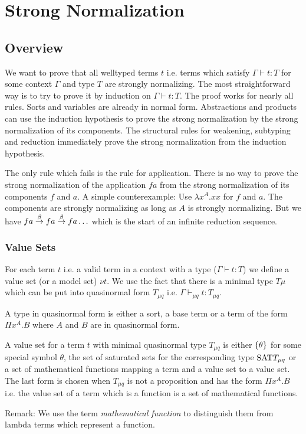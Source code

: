 \section{Strong Normalization}


\subsection{Overview}

We want to prove that all welltyped terms $t$ i.e. terms which satisfy $\Gamma
\vdash t: T$ for some context $\Gamma$ and type $T$ are strongly normalizing.
The most straightforward way is to try to prove it by induction on $\Gamma
\vdash t: T$. The proof works for nearly all rules. Sorts and variables are
already in normal form. Abstractions and products can use the induction
hypothesis to prove the strong normalization by the strong normalization of its
components. The structural rules for weakening, subtyping and reduction
immediately prove the strong normalization from the induction hypothesis.

The only rule which fails is the rule for application. There is no way to prove
the strong normalization of the application $f a$ from the strong normalization
of its components $f$ and $a$. A simple counterexample: Use $\lambda x^A. x x$
for $f$ and $a$. The components are strongly normalizing as long as $A$ is
strongly normalizing. But we have $f a \stackrel{\beta}{\to} f a \stackrel{\beta}{\to} f a \ldots$ which is
the start of an infinite reduction sequence.



\subsubsection{Value Sets}

For each term $t$ i.e. a valid term in a context with a type ($\Gamma \vdash t:
T$) we define a value set (or a model set) $\nu t$. We use the fact that there
is a minimal type $T\mu$ which can be put into quasinormal form $T_{\mu q}$ i.e.
$\Gamma \vdash_{\mu q} t: T_{\mu q}$.

A type in quasinormal form is either a sort, a base term or a term of the form
$\Pi x^A. B$ where $A$ and $B$ are in quasinormal form.

A value set for a term $t$ with minimal quasinormal type $T_{\mu q}$ is either
${\{\theta\}}$ for some special symbol $\theta$, the set of saturated sets for
the corresponding type $\text{SAT} T_{\mu q}$ or a set of mathematical functions
mapping a term and a value set to a value set. The last form is chosen when
$T_{\mu q}$ is not a proposition and has the form $\Pi x^A. B$ i.e. the value
set of a term which is a function is a set of mathematical functions.

Remark: We use the term \emph{mathematical function} to distinguish them from
lambda terms which represent a function.





